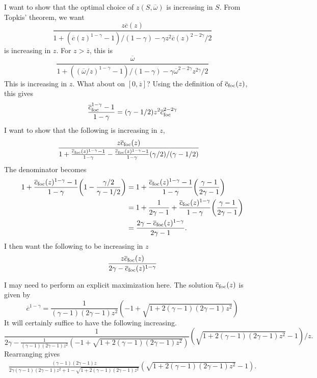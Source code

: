 \documentclass[11pt]{article}
\theoremstyle{plain}
\theoremstyle{definition} %
\begin{document}
I want to show that the optimal choice of $z(S, \overline{\omega})$ is increasing in $S$. From Topkis' theorem, we want 
$$
\frac{z\overline{c}(z)}{1 + (\overline{c}(z)^{1-\gamma}-1)/(1-\gamma) - \gamma z^2\overline{c}(z)^{2-2\gamma}/2}
$$
is increasing in $z$. For $z > \overline{z}$, this is 
$$
\frac{\overline{\omega}}{1 + ((\overline{\omega}/z)^{1 - \gamma} - 1)/(1-\gamma) - \gamma \overline{\omega}^{2-2\gamma}z^{2\gamma}/2}
$$
This is increasing in $z$. What about on $[0, \overline{z}]$? Using the definition of $\overline{c}_{\textnormal{foc}}(z)$, this gives
$$
\frac{\overline{c}_{\textnormal{foc}}^{1-\gamma} - 1}{1-\gamma} = (\gamma-1/2) z^2\overline{c}_{\textnormal{foc}}^{2-2\gamma}
$$
I want to show that the following is increasing in $z$,
\begin{align*}
& \frac{z\overline{c}_{\textnormal{foc}}(z)}{1 + \frac{\overline{c}_{\textnormal{foc}}(z)^{1-\gamma} - 1}{1-\gamma} - \frac{\overline{c}_{\textnormal{foc}}(z)^{1-\gamma} - 1}{1-\gamma}(\gamma/2)/(\gamma-1/2)}
\end{align*}
The denominator becomes
\begin{align*}
 1 + \frac{\overline{c}_{\textnormal{foc}}(z)^{1-\gamma}-1}{1-\gamma}{\left(1 - \frac{\gamma /2}{\gamma-1/2}\right)}
 & = 1 + \frac{\overline{c}_{\textnormal{foc}}(z)^{1-\gamma}-1}{1-\gamma}{\left(\frac{\gamma - 1}{2\gamma-1}\right)}
\\ & = 1 + \frac{1}{2\gamma-1} + \frac{\overline{c}_{\textnormal{foc}}(z)^{1-\gamma}}{1-\gamma}{\left(\frac{\gamma - 1}{2\gamma-1}\right)}
\\ & = \frac{2\gamma - \overline{c}_{\textnormal{foc}}(z)^{1-\gamma}}{2\gamma-1}.
\end{align*}
I then want the following to be increasing in $z$
$$
\frac{z\overline{c}_{\textnormal{foc}}(z)}{2\gamma - \overline{c}_{\textnormal{foc}}(z)^{1-\gamma}}
$$



I may need to perform an explicit maximization here. The solution $\overline{c}_{\textnormal{foc}}(z)$ is given by 
$$ %
\overline{c}^{1-\gamma} = \frac{1}{(\gamma-1)(2\gamma-1) z^2} {\left(-1 + \sqrt{1 + 2(\gamma-1)(2\gamma-1) z^2} \right)}
$$
It will certainly suffice to have the following increasing.
$$
\frac{1}{2\gamma - \frac{1}{(\gamma-1)(2\gamma-1) z^2} {\left(-1 + \sqrt{1 + 2(\gamma-1)(2\gamma-1) z^2} \right)}} {\left(\sqrt{1 + 2(\gamma-1)(2\gamma-1) z^2} - 1 \right)}/z.
$$
Rearranging gives 
\begin{align*}
\frac{(\gamma-1)(2\gamma-1) z}{2\gamma(\gamma-1)(2\gamma-1)z^2 + 1 - \sqrt{1 + 2(\gamma-1)(2\gamma-1) z^2}} {\left(\sqrt{1 + 2(\gamma-1)(2\gamma-1) z^2} - 1 \right)}.
\end{align*}
\end{document}
